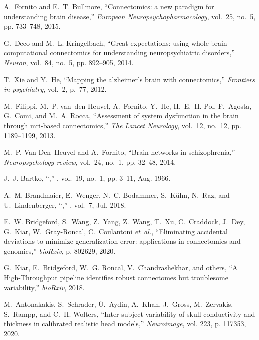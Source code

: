 \documentclass[10pt,letterpaper]{article}
\begin{document}
\begin{thebibliography}{10}
A.~Fornito and E.~T. Bullmore, ``Connectomics: a new paradigm for understanding
  brain disease,'' \emph{European Neuropsychopharmacology}, vol.~25, no.~5, pp.
  733--748, 2015.

G.~Deco and M.~L. Kringelbach, ``Great expectations: using whole-brain
  computational connectomics for understanding neuropsychiatric disorders,''
  \emph{Neuron}, vol.~84, no.~5, pp. 892--905, 2014.

T.~Xie and Y.~He, ``Mapping the alzheimer’s brain with connectomics,''
  \emph{Frontiers in psychiatry}, vol.~2, p.~77, 2012.

M.~Filippi, M.~P. van~den Heuvel, A.~Fornito, Y.~He, H.~E.~H. Pol, F.~Agosta,
  G.~Comi, and M.~A. Rocca, ``Assessment of system dysfunction in the brain
  through mri-based connectomics,'' \emph{The Lancet Neurology}, vol.~12,
  no.~12, pp. 1189--1199, 2013.

M.~P. Van Den~Heuvel and A.~Fornito, ``Brain networks in schizophrenia,''
  \emph{Neuropsychology review}, vol.~24, no.~1, pp. 32--48, 2014.

J.~J. Bartko, ``,'' \emph{}, vol.~19, no.~1, pp. 3--11, Aug. 1966.

A.~M. Brandmaier, E.~Wenger, N.~C. Bodammer, S.~K{\"u}hn, N.~Raz, and
  U.~Lindenberger, ``,''
  \emph{}, vol.~7, Jul. 2018.

E.~W. Bridgeford, S.~Wang, Z.~Yang, Z.~Wang, T.~Xu, C.~Craddock, J.~Dey,
  G.~Kiar, W.~Gray-Roncal, C.~Coulantoni \emph{et~al.}, ``Eliminating
  accidental deviations to minimize generalization error: applications in
  connectomics and genomics,'' \emph{bioRxiv}, p. 802629, 2020.

G.~Kiar, E.~Bridgeford, W.~G. Roncal, V.~Chandrashekhar, and {others}, ``A
  {High-Throughput} pipeline identifies robust connectomes but troublesome
  variability,'' \emph{bioRxiv}, 2018.

M.~Antonakakis, S.~Schrader, {\"U}.~Aydin, A.~Khan, J.~Gross, M.~Zervakis,
  S.~Rampp, and C.~H. Wolters, ``Inter-subject variability of skull
  conductivity and thickness in calibrated realistic head models,''
  \emph{Neuroimage}, vol. 223, p. 117353, 2020.


\end{thebibliography}
\end{document}

